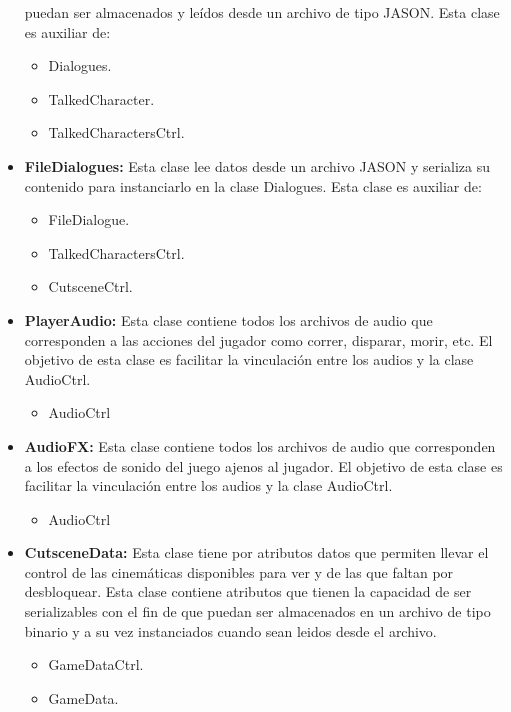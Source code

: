 \begin{itemize}
			puedan ser almacenados y leídos desde un archivo de tipo JASON. Esta clase 
			es auxiliar de:
			\begin{itemize}
				\item Dialogues.
				\item TalkedCharacter.
				\item TalkedCharactersCtrl.
			\end{itemize}
			\item \textbf{FileDialogues:} Esta clase lee datos desde un archivo JASON y 
			serializa su contenido para instanciarlo en la clase Dialogues. Esta clase 
			es auxiliar de:
			\begin{itemize}
				\item FileDialogue.
				\item TalkedCharactersCtrl.
				\item CutsceneCtrl.
			\end{itemize}
			\item \textbf{PlayerAudio:} Esta clase contiene todos los archivos de audio que
			corresponden a las acciones del jugador como correr, disparar, morir, etc. El 
			objetivo de esta clase es facilitar la vinculación entre los audios y la clase
			AudioCtrl. 
			\begin{itemize}
				\item AudioCtrl
			\end{itemize}
			
			\item \textbf{AudioFX:} Esta clase contiene todos los archivos de audio que
			corresponden a los efectos de sonido del juego ajenos al jugador. El 
			objetivo de esta clase es facilitar la vinculación entre los audios y la clase
			AudioCtrl. 
			\begin{itemize}
				\item AudioCtrl
			\end{itemize}
			
			\item \textbf{CutsceneData:} Esta clase tiene por atributos datos que permiten 
			llevar el control de las cinemáticas disponibles para ver y de las que faltan 
			por desbloquear. Esta clase contiene atributos que tienen la capacidad de ser 
			serializables con el fin de que puedan ser almacenados en un archivo de tipo
			binario y a su vez instanciados cuando sean leidos desde el archivo.
			\begin{itemize}
				\item GameDataCtrl.
				\item GameData.
			\end{itemize}
			

\end{itemize}
